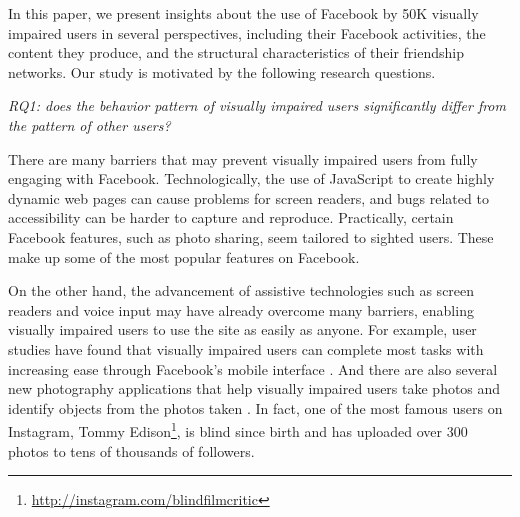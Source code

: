 \documentclass{sigchi}
\begin{document}
 


In this paper, we present insights about the use of Facebook by 50K visually impaired users in several perspectives, including their Facebook activities, the content they produce, and the structural characteristics of their friendship networks. Our study is motivated by the following research questions.

\emph{RQ1: does the behavior pattern of visually impaired users significantly differ from the pattern of other users?}
 
There are many barriers that may prevent visually impaired users from fully engaging with Facebook. Technologically, the use of  JavaScript to create highly dynamic web pages can cause problems for screen readers, and bugs related to accessibility can be harder to capture and reproduce. Practically, certain Facebook features, such as photo sharing, seem tailored to sighted users. These make up some of the most popular features on Facebook.  

On the other hand, the advancement of assistive technologies such as screen readers and voice input may have  already overcome many barriers, enabling visually impaired users to use the site as easily as anyone. For example, user studies have found that visually impaired users can complete most tasks with increasing ease through Facebook's mobile interface \cite{wentz2011}. And there are also several new photography applications that help visually impaired users take photos and identify objects from the photos taken \cite{jayant2011, taptapsee}. In fact, one of the most famous users on Instagram, Tommy Edison\footnote{\url{http://instagram.com/blindfilmcritic}}, is blind since birth and has uploaded over 300 photos to tens of thousands of followers.

\end{document}
